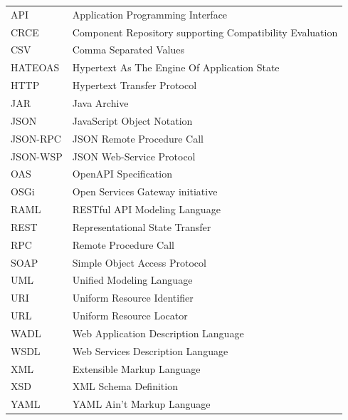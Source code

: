 \documentclass[czech,DP]{thesiskiv}
\newcommand\nomenclature[2]{#1 & #2 \\}
\begin{document}
\begin{longtable}{@{}p{3cm}@{}p{\dimexpr\textwidth-1cm\relax}@{}}
	\nomenclature{API}{Application Programming Interface}
	\nomenclature{CRCE}{Component Repository supporting Compatibility Evaluation}
	\nomenclature{CSV}{Comma Separated Values}
	\nomenclature{HATEOAS}{Hypertext As The Engine Of Application State}
	\nomenclature{HTTP}{Hypertext Transfer Protocol}
	\nomenclature{JAR}{Java Archive}
	\nomenclature{JSON}{JavaScript Object Notation}
	\nomenclature{JSON-RPC}{JSON Remote Procedure Call}	\nomenclature{JSON-WSP}{JSON Web-Service Protocol}
	\nomenclature{OAS}{OpenAPI Specification}
	\nomenclature{OSGi}{Open Services Gateway initiative}
	\nomenclature{RAML}{RESTful API Modeling Language}
	\nomenclature{REST}{Representational State Transfer}
	\nomenclature{RPC}{Remote Procedure Call}
	\nomenclature{SOAP}{Simple Object Access Protocol}
	\nomenclature{UML}{Unified Modeling Language}
	\nomenclature{URI}{Uniform Resource Identifier}
	\nomenclature{URL}{Uniform Resource Locator}
	\nomenclature{WADL}{Web Application Description Language}
	\nomenclature{WSDL}{Web Services Description Language}
	\nomenclature{XML}{Extensible Markup Language}
	\nomenclature{XSD}{XML Schema Definition}
	\nomenclature{YAML}{YAML Ain't Markup Language}
\end{longtable}

\appendix
\end{document}
